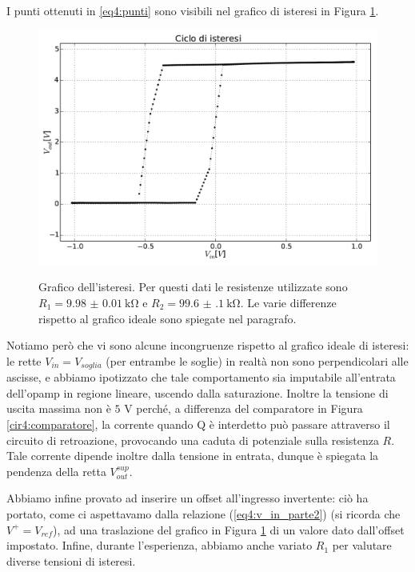 I punti ottenuti in \ref{eq4:punti} sono visibili nel grafico di isteresi in Figura \ref{gr4:isteresi}.

\begin{figure}[ht]
 \centering
   {\includegraphics[width=14.5cm]{../E04/latex/XY.pdf}}
 \caption{Grafico dell'isteresi. Per questi dati le resistenze utilizzate sono $R_1=\SI{9.98(1)}{\kohm}$ e $R_2=\SI{99.6(1)}{\kohm}$. Le varie differenze rispetto al grafico ideale sono spiegate nel paragrafo.}
 \label{gr4:isteresi}
\end{figure}

Notiamo però che vi sono alcune incongruenze rispetto al grafico ideale di isteresi: le rette $V_{in}=V_{soglia}$ (per entrambe le soglie) in realtà non sono perpendicolari alle ascisse, e abbiamo ipotizzato che tale comportamento sia imputabile all'entrata dell'opamp in regione lineare, uscendo dalla saturazione.
Inoltre la tensione di uscita massima non è $5$ \si{\volt} perché, a differenza del comparatore in Figura \ref{cir4:comparatore}, la corrente quando Q è interdetto può passare attraverso il circuito di retroazione, provocando una caduta di potenziale sulla resistenza $R$.
Tale corrente dipende inoltre dalla tensione in entrata, dunque è spiegata la pendenza della retta $V_{out}^{sup}$.

Abbiamo infine provato ad inserire un offset all'ingresso invertente: ciò ha portato, come ci aspettavamo dalla relazione (\ref{eq4:v_in_parte2}) (si ricorda che $V^+=V_{ref}$), ad una traslazione del grafico in Figura \ref{gr4:isteresi} di un valore dato dall'offset impostato. Infine, durante l'esperienza, abbiamo anche variato $R_1$ per valutare diverse tensioni di isteresi.

